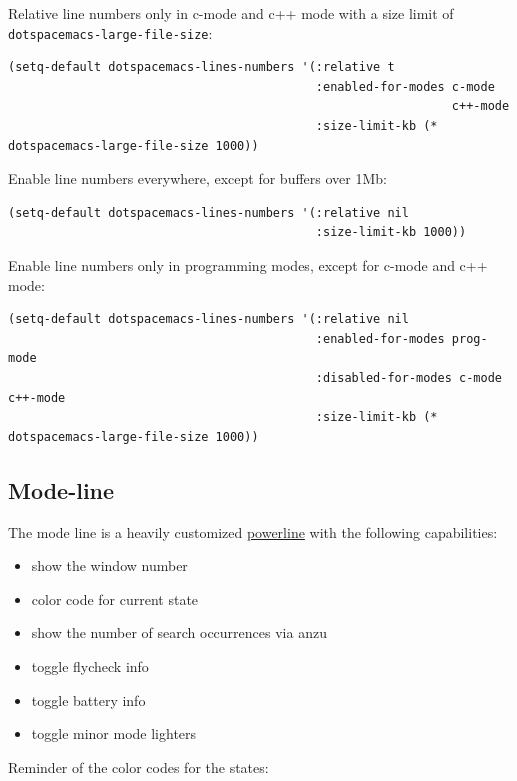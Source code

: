 \documentclass[11pt]{article}
\begin{document}
\begin{enumerate}
Relative line numbers only in c-mode and c++ mode with a size limit of \texttt{dotspacemacs-large-file-size}:

\begin{verbatim}
(setq-default dotspacemacs-lines-numbers '(:relative t
                                           :enabled-for-modes c-mode
                                                              c++-mode
                                           :size-limit-kb (* dotspacemacs-large-file-size 1000))
\end{verbatim}

Enable line numbers everywhere, except for buffers over 1Mb:

\begin{verbatim}
(setq-default dotspacemacs-lines-numbers '(:relative nil
                                           :size-limit-kb 1000))
\end{verbatim}

Enable line numbers only in programming modes, except for c-mode and c++ mode:

\begin{verbatim}
(setq-default dotspacemacs-lines-numbers '(:relative nil
                                           :enabled-for-modes prog-mode
                                           :disabled-for-modes c-mode c++-mode
                                           :size-limit-kb (* dotspacemacs-large-file-size 1000))
\end{verbatim}
\end{enumerate}

\subsection{Mode-line}
\label{sec:org2649cda}
The mode line is a heavily customized \href{https://github.com/milkypostman/powerline}{powerline} with the following capabilities:
\begin{itemize}
\item show the window number
\item color code for current state
\item show the number of search occurrences via anzu
\item toggle flycheck info
\item toggle battery info
\item toggle minor mode lighters
\end{itemize}

Reminder of the color codes for the states:
\end{document}
